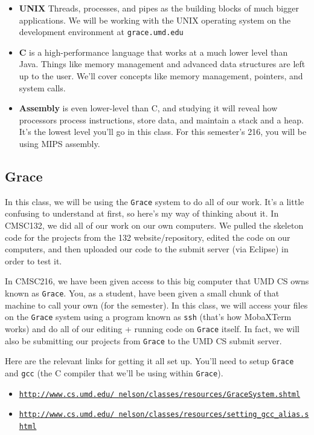 \documentclass[english, 10pt]{article}
\begin{document}
\begin{itemize}
	\item \textbf{UNIX} Threads, processes, and pipes as the building blocks of much bigger applications. We will be working with the UNIX operating system on the development environment at \texttt{grace.umd.edu}
	\item \textbf{C} is a high-performance language that works at a much lower level than Java. Things like memory management and advanced data structures are left up to the user. We'll cover concepts like memory management, pointers, and system calls.
	\item \textbf{Assembly} is even lower-level than C, and studying it will reveal how processors process instructions, store data, and maintain a stack and a heap. It's the lowest level you'll go in this class. For this semester's 216, you will be using MIPS assembly.
\end{itemize}

\subsection{Grace}

In this class, we will be using the \texttt{Grace} system to do all of our work. It's a little confusing to understand at first, so here's my way of thinking about it. In CMSC132, we did all of our work on our own computers. We pulled the skeleton code for the projects from the 132 website/repository, edited the code on our computers, and then uploaded our code to the submit server (via Eclipse) in order to test it.\newline

In CMSC216, we have been given access to this big computer that UMD CS owns known as \texttt{Grace}. You, as a student, have been given a small chunk of that machine to call your own (for the semester). In this class, we will access your files on the \texttt{Grace} system using a program known as \texttt{ssh} (that's how MobaXTerm works) and do all of our editing + running code on \texttt{Grace} itself. In fact, we will also be submitting our projects from \texttt{Grace} to the UMD CS submit server.\newline

Here are the relevant links for getting it all set up. You'll need to setup  \texttt{Grace} and \texttt{gcc} (the C compiler that we'll be using within \texttt{Grace}).\newline\newline
\begin{itemize}
	\item \texttt{\href{http://www.cs.umd.edu/~nelson/classes/resources/GraceSystem.shtml}{http://www.cs.umd.edu/~nelson/classes/resources/GraceSystem.shtml}}
	\item \texttt{\href{http://www.cs.umd.edu/~nelson/classes/resources/setting_gcc_alias.shtml}{http://www.cs.umd.edu/~nelson/classes/resources/setting\_gcc\_alias.shtml}} 
\end{itemize}
 
\end{document}
